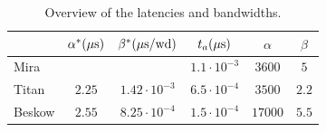 \documentclass{sig-alternate}
\begin{document}
\begin{table}
\centering
\caption{Overview of the latencies and bandwidths.}
\begin{tabular}{l|ccccc} 
\hline
 & $\alpha^* (\unit[]{\mu s})$ & $\beta^* (\unit[]{\mu s/wd})$ & $t_a (\unit[]{\mu s})$ & $\alpha$ & $\beta$ \\
 \hline
Mira   &        &                     & $1.1 \cdot 10^{-3}$ & $3600$ & $5$   \\ 
Titan  & $2.25$ & $1.42\cdot 10^{-3}$ & $6.5 \cdot 10^{-4}$ & $3500$ & $2.2$ \\ %
Beskow & $2.55$ & $8.25\cdot 10^{-4}$ & $1.5 \cdot 10^{-4}$ &$17000$ & $5.5$ \\ %
\hline
\end{tabular}
\label{tab:alpha_beta}
\end{table}
\end{document}

